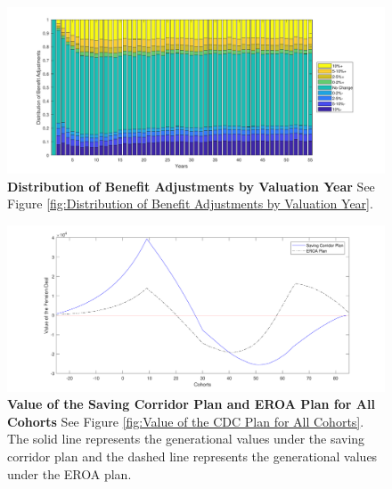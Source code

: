 \documentclass{sfuthesis}
\numberwithin{equation}{chapter}
\begin{document}
		\begin{figure}[H]
			\includegraphics[width=1\linewidth]{ResultPlot/ProbIncDc3.pdf} 
			\caption[Distribution of Benefit Adjustments by Valuation Year]{\textbf{Distribution of Benefit Adjustments by Valuation Year}
			\vspace{-0.4cm}
			\newline\footnotesize\justify See Figure \ref{fig:Distribution of Benefit Adjustments by Valuation Year}.}
			\label{fig:Distribution of Benefit Adjustments by Valuation Year 4}
		\end{figure}
	
	
		\begin{figure}[h]
			\includegraphics[width=1\linewidth]{ResultPlot/VPension3.pdf} 
			\caption[Value of the Saving Corridor Plan and EROA Plan for All Cohorts]{\textbf{Value of the Saving Corridor Plan and EROA Plan for All Cohorts}
			\newline\footnotesize\justify See Figure \ref{fig:Value of the CDC Plan for All Cohorts}. The solid line represents the generational values under the saving corridor plan and the dashed line represents the generational values under the EROA plan.}
			\label{fig:Value of the saving Corridor Plan for All Cohorts}
		\end{figure}
		\vspace{-0.4cm}
		
\end{document}
